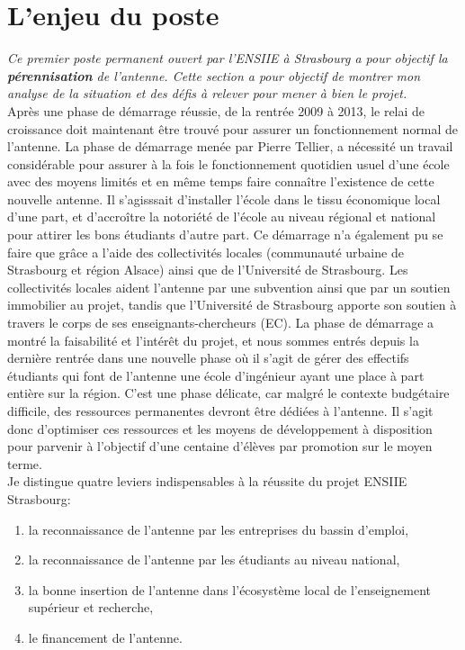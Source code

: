 \documentclass[11pt]{article}
\begin{document}
\section{L'enjeu du poste}

\medskip
\emph{Ce  premier  poste permanent  ouvert  par  l'ENSIIE  à Strasbourg  a  pour
  objectif la \textbf{pérennisation} de l'antenne. Cette section a pour objectif
  de montrer  mon analyse de la  situation et des  défis à relever pour  mener à
  bien le projet.}\\

Après une  phase de démarrage réussie,  de la rentrée  2009 à 2013, le  relai de
croissance doit maintenant être trouvé  pour assurer un fonctionnement normal de
l'antenne.   La phase  de démarrage  menée par  Pierre Tellier,  a nécessité  un
travail considérable  pour assurer à  la fois le fonctionnement  quotidien usuel
d'une école avec des moyens limités et en même temps faire connaître l'existence
de cette  nouvelle antenne.   Il s'agisssait d'installer  l'école dans  le tissu
économique local  d'une part, et d'accroître  la notoriété de l'école  au niveau
régional et national pour attirer les bons étudiants d'autre part.  Ce démarrage
n'a  également  pu  se  faire  que grâce  a  l'aide  des  collectivités  locales
(communauté urbaine de Strasbourg et région Alsace) ainsi que de l'Université de
Strasbourg. Les collectivités locales aident  l'antenne par une subvention ainsi
que par un  soutien immobilier au projet, tandis que  l'Université de Strasbourg
apporte son  soutien à travers le  corps de ses enseignants-chercheurs  (EC). La
phase  de démarrage  a montré  la faisabilité  et l'intérêt  du projet,  et nous
sommes entrés depuis la dernière rentrée dans une nouvelle phase où il s'agit de
gérer des effectifs étudiants qui font  de l'antenne une école d'ingénieur ayant
une place à part entière sur la région.  C'est une phase délicate, car malgré le
contexte budgétaire difficile, des ressources permanentes devront être dédiées à
l'antenne.   Il  s'agit  donc  d'optimiser  ces  ressources  et  les  moyens  de
développement à disposition  pour parvenir à l'objectif  d'une centaine d'élèves
par promotion sur le moyen terme.\\


Je  distingue quatre  leviers  indispensables  à la  réussite  du projet  ENSIIE
Strasbourg:
\begin{enumerate}
\item la reconnaissance de l'antenne par les entreprises du bassin d'emploi,
\item la reconnaissance de l'antenne par les étudiants au niveau national,
\item la bonne insertion de  l'antenne dans l'écosystème local de l'enseignement
  supérieur et recherche,
\item le financement de l'antenne.
\end{enumerate}
\end{document}
